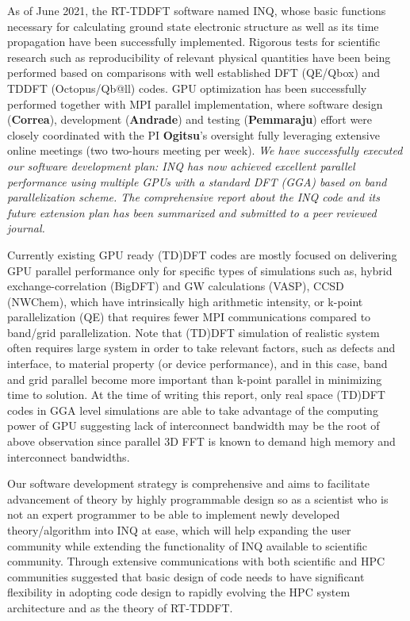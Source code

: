 As of June 2021, the RT-TDDFT software named INQ, whose basic functions necessary for calculating ground state electronic structure as well as its time propagation have been successfully implemented. Rigorous tests for scientific research such as reproducibility of relevant physical quantities have been being performed based on comparisons with well established DFT (QE/Qbox) and TDDFT (Octopus/Qb@ll) codes. GPU optimization has been successfully performed together with MPI parallel implementation, where software design ({\bf Correa}), development ({\bf Andrade}) and testing ({\bf Pemmaraju}) effort were closely coordinated with the PI {\bf Ogitsu}'s oversight fully leveraging extensive online meetings (two two-hours meeting per week). {\it We have successfully executed our software development plan: INQ has now achieved excellent parallel performance using multiple GPUs with a standard DFT (GGA) based on band parallelization scheme. The comprehensive report about the INQ code and its future extension plan has been summarized and submitted to a peer reviewed journal.}\cite{andrade2021inq}

Currently existing GPU ready (TD)DFT codes are mostly focused on delivering GPU parallel performance only for specific types of simulations such as, hybrid exchange-correlation (BigDFT)\cite{BigDFT2018} and GW calculations (VASP),\cite{vasp2012,vasp2012b,vasp2018,vasp2019} CCSD (NWChem),\cite{NWChem2013} which have intrinsically high arithmetic intensity, or k-point parallelization (QE)\cite{QE2017,QE2020} that requires  fewer MPI communications compared to band/grid parallelization. Note that (TD)DFT simulation of realistic system often requires large system in order to take relevant factors, such as defects and interface, to material property (or device performance), and in this case, band and grid parallel become more important than k-point parallel in minimizing time to solution. At the time of writing this report, only real space (TD)DFT codes\cite{andrade2012time,andrade2013real,SparcX2021} in GGA level simulations are able to take advantage of the computing power of GPU suggesting lack of interconnect bandwidth may be the root of above observation since parallel 3D FFT is known to demand high memory and interconnect bandwidths.\cite{heFFTe2020}

Our software development strategy is comprehensive and aims to facilitate advancement of theory by highly programmable design so as a scientist who is not an expert programmer to be able to implement newly developed theory/algorithm into INQ at ease, which will help expanding the user community while extending the functionality of INQ available to scientific community. Through extensive communications with both scientific and HPC communities suggested that basic design of code needs to have significant flexibility in adopting code design to rapidly evolving the HPC system architecture and as the theory of RT-TDDFT. 

